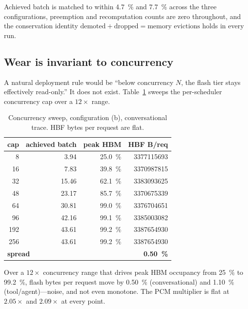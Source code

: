 \documentclass[conference]{IEEEtran}
\newcommand{\cfgb}{\textsf{(b)}}
\begin{document}
Achieved batch is matched to within \SI{4.7}{\percent} and \SI{7.7}{\percent}
across the three configurations, preemption and recomputation counts are zero
throughout, and the conservation identity
$\text{demoted} + \text{dropped} = \text{memory evictions}$ holds in every run.

\subsection{Wear is invariant to concurrency}\label{sec:batch}

A natural deployment rule would be ``below concurrency $N$, the flash tier stays
effectively read-only.'' It does not exist. Table~\ref{tab:batch} sweeps the
per-scheduler concurrency cap over a $12\times$ range.

\begin{table}[t]
\centering
\caption{Concurrency sweep, configuration \cfgb, conversational trace.
HBF bytes per request are flat.}
\label{tab:batch}
\small
\begin{tabular}{rrrr}
\toprule
\textbf{cap} & \textbf{achieved batch} & \textbf{peak HBM} & \textbf{HBF B/req} \\
\midrule
8   & 3.94  & \SI{25.0}{\percent} & \num{3377115693} \\
16  & 7.83  & \SI{39.8}{\percent} & \num{3370987815} \\
32  & 15.46 & \SI{62.1}{\percent} & \num{3383093625} \\
48  & 23.17 & \SI{85.7}{\percent} & \num{3370675339} \\
64  & 30.81 & \SI{99.0}{\percent} & \num{3376704651} \\
96  & 42.16 & \SI{99.1}{\percent} & \num{3385003082} \\
192 & 43.61 & \SI{99.2}{\percent} & \num{3387654930} \\
256 & 43.61 & \SI{99.2}{\percent} & \num{3387654930} \\
\midrule
\multicolumn{3}{l}{\textbf{spread}} & \textbf{\SI{0.50}{\percent}} \\
\bottomrule
\end{tabular}
\end{table}

Over a $12\times$ concurrency range that drives peak HBM occupancy from
\SI{25}{\percent} to \SI{99.2}{\percent}, flash bytes per request move by
\SI{0.50}{\percent} (conversational) and \SI{1.10}{\percent} (tool/agent)---noise,
and not even monotone. The PCM multiplier is flat at $2.05\times$ and
$2.09\times$ at every point.
\end{document}
